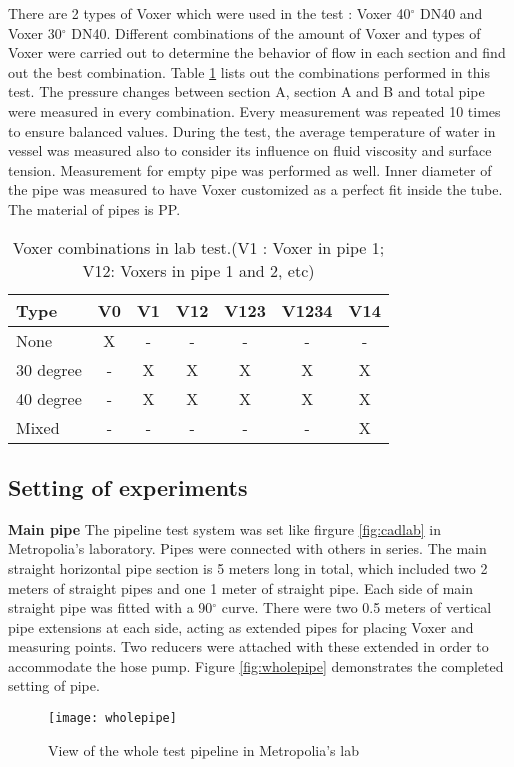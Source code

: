 There are 2 types of Voxer which were used in the test : Voxer 40$^{\circ}$ DN40 and Voxer 30$^{\circ}$ DN40.  Different combinations of the amount of Voxer and types of Voxer were carried out to determine the behavior of flow in each section and find out the best combination. Table \ref{table:combi} lists out the combinations performed in this test. The pressure changes between section A, section A and B and total pipe were measured in every combination. Every measurement was repeated 10 times to ensure balanced values. During the test, the average temperature of water in vessel was measured also to consider its influence on fluid viscosity and surface tension. Measurement for empty pipe was performed as well. Inner diameter of the pipe was measured to have Voxer customized as a perfect fit inside the tube. The material of pipes is PP.
\begin{table}[h]
  \centering
  \caption{Voxer combinations in lab test.\newline (V1 : Voxer in pipe 1; V12: Voxers in pipe 1 and 2, etc)}
  \begin{tabular}{l*{6}{c}}
Type             & V0 & V1 & V12 & V123 & V1234 & V14 \\
\hline
None & X & - & - & - & - & -   \\
30 degree           & - & X & X & X &  X & X  \\
40 degree           & - & X & X & X &  X & X   \\
Mixed     & - & - & - & - & - & X   \\
\end{tabular}
  \label{table:combi}
\end{table}
\subsection{Setting of experiments}
\textbf{Main pipe} \newline
The pipeline test system was set like firgure \vref{fig:cadlab} in Metropolia’s laboratory.  Pipes were connected with others in series. The main straight horizontal pipe section is 5 meters long in total, which included two 2 meters of straight pipes and one 1 meter of straight pipe. Each side of main straight pipe was fitted with a 90$^{\circ}$ curve. There were two 0.5 meters of vertical pipe extensions at each side, acting as extended pipes for placing Voxer and measuring points. Two reducers were attached with these extended in order to accommodate the hose pump. Figure \vref{fig:wholepipe} demonstrates the completed setting of pipe.
\begin{figure}[h]
  \centering
  \texttt{[image: wholepipe]}
  \caption{View of the whole test pipeline in Metropolia's lab }
  \label{fig:wholepipe}
\end{figure}

